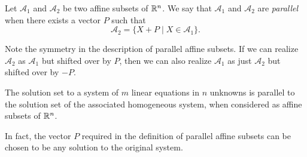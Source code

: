\documentclass[elementsmain.tex]{subfiles}
\begin{document}
\begin{definition} Let $\mathcal{A}_1$ and $\mathcal{A}_2$ be two affine subsets of $\mathbb{R}^n$. We say that $\mathcal{A}_1$ and $\mathcal{A}_2$ are \emph{parallel} when there exists a vector $P$ such that
\[
\mathcal{A}_2 = \{ X + P \mid X \in \mathcal{A}_1 \}.
\]
\end{definition}

\begin{remark} Note the symmetry in the description of parallel affine subsets. If we can realize $\mathcal{A}_2$ as $\mathcal{A}_1$ but shifted over by $P$, then we can also realize $\mathcal{A}_1$ as just $\mathcal{A}_2$ but shifted over by $-P$. 
\end{remark}

\begin{theorem}\label{thm:07-parallel-solns}
The solution set to a system of $m$ linear equations in $n$ unknowns is parallel to the solution set of the associated homogeneous system, when considered as affine subsets of $\mathbb{R}^n$.

In fact, the vector $P$ required in the definition of parallel affine subsets can be chosen to be any solution to the original system.
\end{theorem}
\end{document}
